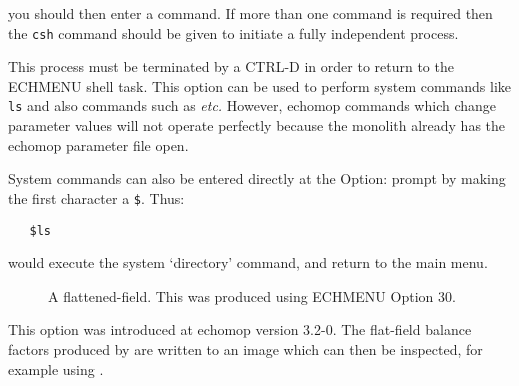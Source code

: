 you should then enter a command.  If more than one command is
required then the \verb+csh+ command should be given to initiate a fully
independent process.

This process must be terminated by a CTRL-D in order to return to the
ECHMENU shell task.
This option can be used to perform system commands like \verb+ls+ and also
 commands such as
 {\it etc.}  However, {\sc echomop}
commands which change parameter values will not operate perfectly because the
monolith already has the {\sc echomop} parameter file open.

System commands can also be entered directly at the Option: prompt by
making the first character a {\tt \$}. Thus:

\begin{verbatim}
   $ls
\end{verbatim}

would execute the system `directory' command, and return to the main menu.


\begin{figure}
\begin{center}
{\leavevmode\epsfysize=136mm}

\parbox{140mm}{
\caption{A flattened-field.  This was produced using ECHMENU Option 30.}
\label{fi_genflat}
}
\end{center}
\end{figure}

This option was introduced at {\sc echomop} version 3.2-0.  The flat-field balance
factors produced by  are written to an
image which can then be inspected, for example using 
.


\vspace*{11mm}


